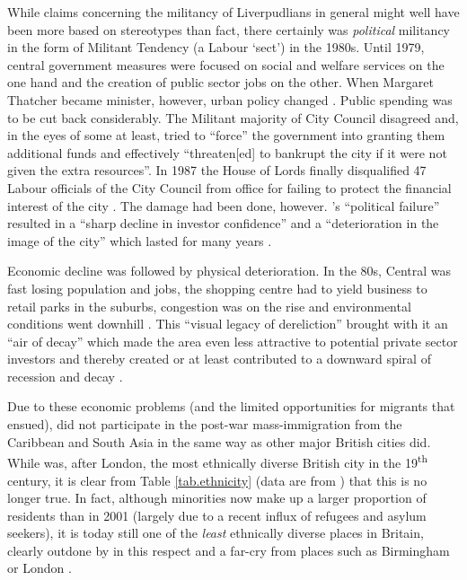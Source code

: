 While claims concerning the militancy of Liverpudlians in general might well have been more based on stereotypes than fact, there certainly was \emph{political} militancy in the form of Militant Tendency (a Labour `sect') in the 1980s.
Until 1979, central government measures were focused on social and welfare services on the one hand and the creation of public sector jobs on the other. When Margaret Thatcher became  minister, however, urban policy changed \citep[cf.][19]{juddparkinson1990a}.
Public spending was to be cut back considerably.
The Militant majority of  City Council disagreed and, in the eyes of some at least, tried to \enquote{force} the government into granting them additional funds and effectively ``threaten[ed] to bankrupt the city if it were not given the extra resources''.
In 1987 the House of Lords finally disqualified 47 Labour officials of the City Council from office for failing to protect the financial interest of the city \citep[cf.][249--250]{parkinson1990}.
The damage had been done, however.
's ``political failure'' \citep[241]{parkinson1990} resulted in a ``sharp decline in investor confidence'' and a ``deterioration in the image of the city'' which lasted for many years \citep[172]{couch2003a}.

Economic decline was followed by physical deterioration.
In the 80s, Central  was fast losing population and jobs, the shopping centre had to yield business to retail parks in the suburbs, congestion was on the rise and environmental conditions went downhill \citep[cf.][38]{couch2003}.
This ``visual legacy of dereliction'' brought with it an ``air of decay'' which made the area even less attractive to potential private sector investors and thereby created or at least contributed to a downward spiral of recession and decay \citep[21]{fraser2003}.

Due to these economic problems (and the limited opportunities for migrants that ensued),  did not participate in the post-war mass-immigration from the Caribbean and South Asia in the same way as other major British cities did.
While  was, after London, the most ethnically diverse British city in the 19\textsuperscript{th} century, it is clear from Table \ref{tab.ethnicity} (data are from \citealt{nomis}) that this is no longer true.
In fact, although minorities now make up a larger proportion of  residents than in 2001 (largely due to a recent influx of refugees and asylum seekers), it is today still one of the \emph{least} ethnically diverse places in Britain, clearly outdone by  in this respect and a far-cry from places such as Birmingham or London \citep[cf.][187]{pooley2006}.

